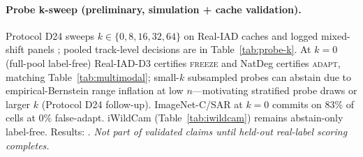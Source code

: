 \documentclass[conference]{IEEEtran}
\theoremstyle{plain}
\theoremstyle{definition}
\begin{document}
\paragraph{Probe k-sweep (preliminary, simulation + cache validation).}
Protocol D24 sweeps $k\in\{0,8,16,32,64\}$ on Real-IAD caches and logged mixed-shift panels
; pooled track-level decisions are in
Table~\ref{tab:probe-k}. At $k{=}0$ (full-pool label-free) Real-IAD-D3 certifies \textsc{freeze} and
NatDeg certifies \textsc{adapt}, matching Table~\ref{tab:multimodal}; small-$k$ subsampled probes can
abstain due to empirical-Bernstein range inflation at low $n$---motivating stratified probe draws or
larger $k$ (Protocol D24 follow-up). ImageNet-C/SAR at $k{=}0$ commits on $83\%$ of cells at
$0\%$ false-adapt. iWildCam (Table~\ref{tab:iwildcam}) remains abstain-only label-free. Results:
. \emph{Not part of validated
claims until held-out real-label scoring completes.}

\begin{table}[H]\centering\footnotesize
\caption{Target-label-light probe k-sweep (Protocol D24, preliminary). Pooled track-level
$\hat\Delta$, certificate decision, and $\varepsilon$ at $\alpha{=}0.10$. Rows marked
\textsc{tbd} await held-out real-label probe scoring.}
\label{tab:probe-k}
\end{table}
\end{document}
